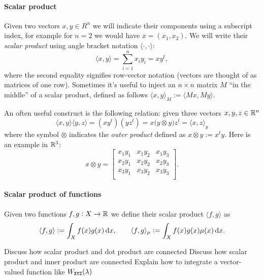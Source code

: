 \paragraph{Scalar product}

Given two vectors $x,y \in R^n$ we will indicate their components using a
subscript index,
for example for $n=2$ we would have $x = (x_1, x_2)$.
We will write their \textsl{scalar product} using angle bracket notation
$\langle \cdot, \cdot \rangle$:
\begin{displaymath}
\langle x, y \rangle = \sum_{i=1}^n x_i y_i = xy^t,
\end{displaymath}
where the second equality signifies row-vector notation (vectors are thought
of as matrices of one row). Sometimes it's useful to inject an $n\times n$ matrix $M$ ``in the middle''
of a scalar product, defined as follows $\langle x, y \rangle_M := \langle M x, M y \rangle$.

An often useful construct is the following relation: given
three vectors $x,y,z \in \mathbb{R}^n$
\begin{displaymath}
\langle x,y \rangle \langle y,z \rangle
  = \left(x y^t\right)\left(y z^t\right)
  = x \big(y \otimes y\big) z^t
  = \langle x, z\rangle_y
\end{displaymath}
where the symbol $\otimes$ indicates the \textsl{outer product} defined as $x\otimes y :=
x^t y$. Here is an example in $\mathbb{R}^3$:
\begin{displaymath}
x\otimes y =
\left[
\begin{array}{ccc}
x_1 y_1 & x_1 y_2 & x_1 y_3 \\
x_2 y_1 & x_2 y_2 & x_2 y_3 \\
x_3 y_1 & x_3 y_2 & x_3 y_3 \\
\end{array}
\right].
\end{displaymath}


\paragraph{Scalar product of functions}
Given two functions $f,g:X\to\mathbb{R}$ we define their scalar product
$\langle f, g \rangle$ as
\begin{displaymath}
\langle f, g \rangle := \int_X f(x)g(x) \mathop{}\!\mathrm{d} x, \qquad \langle f, g \rangle_\mu := \int_X f(x)g(x)\mu(x) \mathop{}\!\mathrm{d} x.
\end{displaymath}

\begin{inconstruction}
	Discuss how scalar product and dot product are connected
	Discuss how scalar product and inner product are connected
	Explain how to integrate a vector-valued function like $W_{\texttt{XYZ}}(\lambda)$ 
\end{inconstruction}

